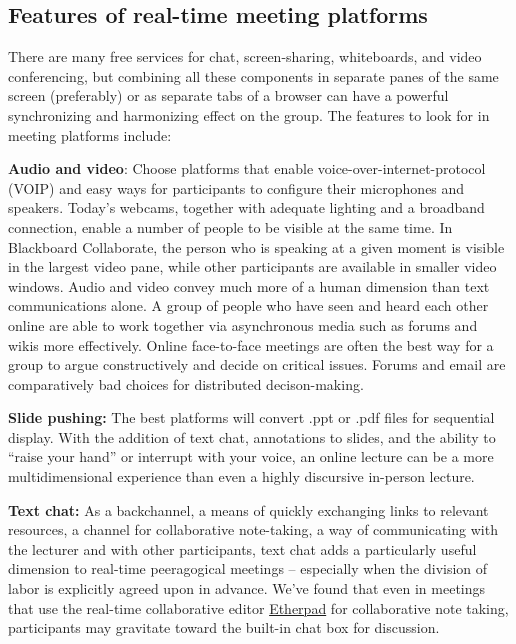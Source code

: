 \hypertarget{features-of-real-time-meeting-platforms}{%
\subsection{Features of real-time meeting
platforms}\label{features-of-real-time-meeting-platforms}}

There are many free services for chat, screen-sharing, whiteboards, and
video conferencing, but combining all these components in separate panes
of the same screen (preferably) or as separate tabs of a browser can
have a powerful synchronizing and harmonizing effect on the group. The
features to look for in meeting platforms include:

\textbf{Audio and video}: Choose platforms that enable
voice-over-internet-protocol (VOIP) and easy ways for participants to
configure their microphones and speakers. Today's webcams, together with
adequate lighting and a broadband connection, enable a number of people
to be visible at the same time. In Blackboard Collaborate, the person
who is speaking at a given moment is visible in the largest video pane,
while other participants are available in smaller video windows. Audio
and video convey much more of a human dimension than text communications
alone. A group of people who have seen and heard each other online are
able to work together via asynchronous media such as forums and wikis
more effectively. Online face-to-face meetings are often the best way
for a group to argue constructively and decide on critical issues.
Forums and email are comparatively bad choices for distributed
decison-making.

\textbf{Slide pushing:} The best platforms will convert .ppt or .pdf
files for sequential display. With the addition of text chat,
annotations to slides, and the ability to ``raise your hand'' or
interrupt with your voice, an online lecture can be a more
multidimensional experience than even a highly discursive in-person
lecture.

\textbf{Text chat:} As a backchannel, a means of quickly exchanging
links to relevant resources, a channel for collaborative note-taking, a
way of communicating with the lecturer and with other participants, text
chat adds a particularly useful dimension to real-time peeragogical
meetings -- especially when the division of labor is explicitly agreed
upon in advance. We've found that even in meetings that use the
real-time collaborative editor \href{http://etherpad.org}{Etherpad} for
collaborative note taking, participants may gravitate toward the
built-in chat box for discussion.

